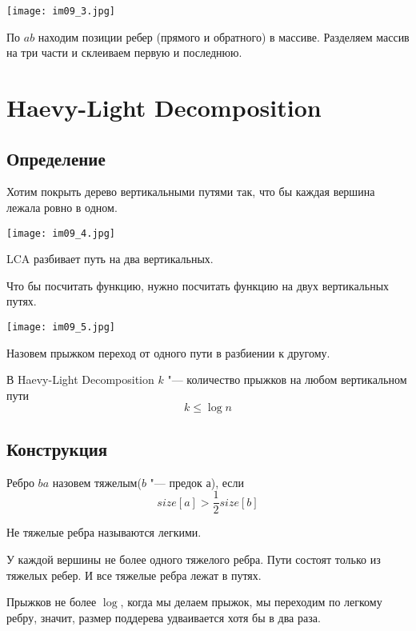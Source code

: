 \begin{center}
\texttt{[image: im09\_3.jpg]}
\end{center}

По $ab$ находим позиции ребер (прямого и обратного) в массиве.
Разделяем массив на три части и склеиваем первую и последнюю.

\section{Haevy-Light Decomposition}

\subsection{Определение}

Хотим покрыть дерево вертикальными путями так, что бы каждая вершина лежала ровно в одном.

\begin{center}
\texttt{[image: im09\_4.jpg]}
\end{center}

LCA разбивает путь на два вертикальных.

Что бы посчитать функцию, нужно посчитать функцию на двух вертикальных путях.

\begin{center}
\texttt{[image: im09\_5.jpg]}
\end{center}

\begin{Def}
	Назовем прыжком переход от одного пути в разбиении к другому.
\end{Def}

В Haevy-Light Decomposition $k$ "--- количество прыжков на любом вертикальном пути
\[ k \le \log n \]

\subsection{Конструкция}
\begin{Def}
	Ребро $ba$ назовем тяжелым($b$ "--- предок $а$), если
	\[ size[a] > \frac{1}{2}size[b] \]
\end{Def}
\begin{Def}
	Не тяжелые ребра называются легкими.
\end{Def}

У каждой вершины не более одного тяжелого ребра.
Пути состоят только из тяжелых ребер.
И все тяжелые ребра лежат в путях.

Прыжков не более $\log$, когда мы делаем прыжок, мы переходим по легкому ребру, значит, размер поддерева удваивается хотя бы в два раза.


